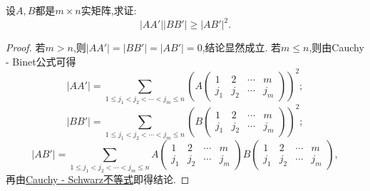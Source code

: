 \documentclass[../../main.tex]{subfiles}%
\begin{document}
\begin{example}
设\(A,B\)都是\(m\times n\)实矩阵,求证:
\[
|AA'||BB'|\geqslant |AB'|^2.
\]
\end{example}
\begin{proof}
若\(m > n\),则\(|AA'| = |BB'| = |AB'| = 0\),结论显然成立.
若\(m\leqslant  n\),则由Cauchy - Binet公式可得
\[
|AA'|=\sum_{1\leqslant  j_1<j_2<\cdots<j_m\leqslant  n}\left(A\begin{pmatrix}
1 & 2 & \cdots & m\\
j_1 & j_2 & \cdots & j_m
\end{pmatrix}\right)^2;
\]
\[
|BB'|=\sum_{1\leqslant  j_1<j_2<\cdots<j_m\leqslant  n}\left(B\begin{pmatrix}
1 & 2 & \cdots & m\\
j_1 & j_2 & \cdots & j_m
\end{pmatrix}\right)^2;
\]
\[
|AB'|=\sum_{1\leqslant  j_1<j_2<\cdots<j_m\leqslant  n}A\begin{pmatrix}
1 & 2 & \cdots & m\\
j_1 & j_2 & \cdots & j_m
\end{pmatrix}B\begin{pmatrix}
1 & 2 & \cdots & m\\
j_1 & j_2 & \cdots & j_m
\end{pmatrix},
\]
再由\hyperref[theorem:Cauchy - Schwarz不等式]{Cauchy - Schwarz不等式}即得结论.
\end{proof}
\end{document}
